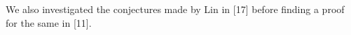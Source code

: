 \documentclass[12pt,a4paper]{report}
\theoremstyle{plain}
\theoremstyle{definition}
\theoremstyle{remark}
\begin{document}
We also investigated the conjectures made by Lin in [17] before finding a proof for the same in [11].

\clearpage



\tableofcontents
\clearpage


\newpage

\setcounter{page}{1}


\part{}








\part{}





\nocite{atkin1} \nocite{atkin2} \nocite{barman} \nocite{berndt} \nocite{dyson}  \nocite{mao1} \nocite{mao2} \nocite{Lin2017} \nocite{chan1} \nocite{chan2} \nocite{chan3} \nocite{kim1} \nocite{kim2} \nocite{kim3} \nocite{zhao1} \nocite{gireesh} \nocite{cooper} \nocite{hwan} \nocite{sellers} \nocite{berndt2}



\end{document}
